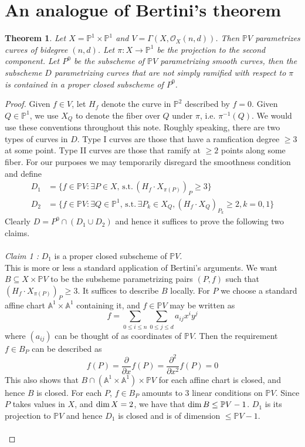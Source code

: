 \documentclass[12pt]{article}
\theoremstyle{plain}
\newtheorem{theorem}[equation]{Theorem}
\theoremstyle{definition}
\newcommand{\IA}{\mathbb{A}}
\newcommand{\IP}{\mathbb{P}}
\newcommand{\sO}{\mathcal{O}}
\renewcommand\dim{{\rm dim\,}}
\newcommand{\<}{\langle}
\renewcommand{\>}{\rangle}
\newcommand{\p}{\partial}
\newcommand{\st}{\, \mathrm{ s.t. }\,}
\begin{document}
\section{An analogue of Bertini's theorem}
\begin{theorem}
Let $X = \IP^1 \times \IP^1$ and $V = \Gamma(X, \sO_X(n, d))$. Then $\IP V$ parametrizes curves of bidegree $(n, d)$. Let $\pi : X \to \IP^1$ be the projection to the second component. Let $P^0$ be the subscheme of $\IP V$ parametrizing smooth curves, then the subscheme $D$ parametrizing curves that are \textit{not} simply ramified with respect to $\pi$ is contained in a proper closed subscheme of $P^0$. 
\end{theorem} 
\begin{proof}
Given $f \in V$, let $H_f$ denote the curve in $\IP^2$ described by $f = 0$. Given $Q \in \IP^1$, we use $X_Q$ to denote the fiber over $Q$ under $\pi$, i.e. $\pi^{-1}(Q)$. We would use these conventions throughout this note. Roughly speaking, there are two types of curves in $D$. Type I curves are those that have a ramfication degree $\ge 3$ at some point. Type II curves are those that ramify at $\ge 2$ points along some fiber. For our purposes we may temporarily disregard the smoothness condition and define 
\begin{align*} 
D_1 &= \{ f \in \IP V : \exists P \in X, \st (H_f \cdot X_{\pi(P)})_P \ge 3 \} \\
D_2 &= \{ f \in \IP V : \exists Q \in \IP^1, \st \exists P_k \in X_Q, (H_f \cdot X_{Q})_{P_k} \ge 2, k = 0, 1 \}
\end{align*}
Clearly $D = P^0 \cap (D_1 \cup D_2)$ and hence it suffices to prove the following two claims. \\\\
\textit{Claim 1 :} $D_1$ is a proper closed subscheme of $\IP V$. \\
This is more or less a standard application of Bertini's arguments. We want $B \subseteq X \times \IP V$ to be the subsheme parametrizing pairs $(P, f)$ such that $(H_f \cdot X_{\pi(P)})_P \ge 3$. It suffices to describe $B$ locally. For $P$ we choose a standard affine chart $\IA^1 \times \IA^1$ containing it, and $f \in \IP V$ may be written as 
$$ f = \sum_{0 \le i \le n} \sum_{0 \le j \le d} a_{ij} x^i y^j $$
where $(a_{ij})$ can be thought of as coordinates of $\IP V$. Then the requirement $ f \in B_P $ can be described as 
$$ f(P) = \frac{ \p }{\p x } f (P) = \frac{ \p^2 }{\p x^2 } f(P) = 0 $$
This also shows that $B \cap (\IA^1 \times \IA^1) \times \IP V$ for each affine chart is closed, and hence $B$ is closed. For each $P$, $f \in B_P$ amounts to $3$ linear conditions on $\IP V$. Since $P$ takes values in $X$, and $\dim X = 2$, we have that $\dim B \le \IP V - 1$. $D_1$ is its projection to $\IP V$ and hence $D_1$ is closed and is of dimension $\le \IP V - 1$. \\\\

\end{proof}
\end{document}
